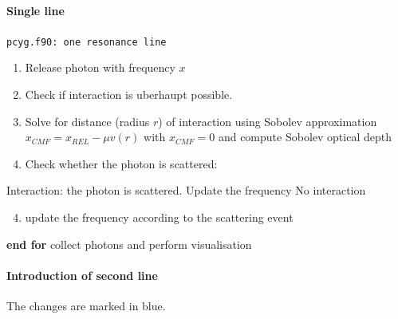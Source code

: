 \documentclass[../main/main.tex]{subfiles}
\begin{document}
\paragraph{Single line}
\begin{center}
\vspace{-0.45cm}
\begin{algorithm}[!htp]
\caption{\texttt{pcyg.f90: one resonance line}}
\label{pcyg_one_line}
\begin{algorithmic}

\begin{enumerate}
\item Release photon with frequency $x$
\item Check if interaction is uberhaupt possible.
\item Solve for distance (radius $r$) of interaction using Sobolev approximation $x_{CMF} = x_{REL} - \mu v(r)$ with $\boxed{x_{CMF} = 0}$ and compute Sobolev optical depth
\item Check whether the photon is scattered:
\end{enumerate}
\State Interaction: the photon is scattered. Update the frequency
\Else \State No interaction
\EndIf

\begin{enumerate}
\setcounter{enumi}{3}
\item update the frequency according to the scattering event
\end{enumerate}
	
\EndFor
\State \textbf{end for}
\State collect photons and perform visualisation

\end{algorithmic}
\end{algorithm}
\end{center}

\paragraph{Introduction of second line}
The changes are marked in blue.
\end{document}
